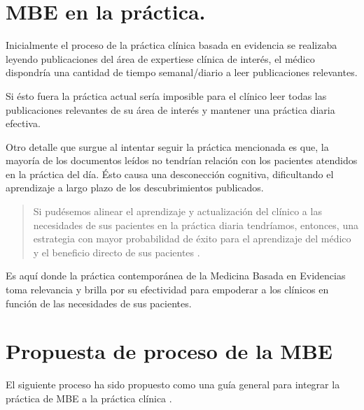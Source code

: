 \documentclass[]{book}
\begin{document}
\hypertarget{mbe-en-la-practica.}{%
\section{MBE en la práctica.}\label{mbe-en-la-practica.}}

Inicialmente el proceso de la práctica clínica basada en evidencia se realizaba leyendo publicaciones del área de expertiese clínica de interés, el médico dispondría una cantidad de tiempo semanal/diario a leer publicaciones relevantes.

Si ésto fuera la práctica actual sería imposible para el clínico leer todas las publicaciones relevantes de su área de interés y mantener una práctica diaria efectiva.

Otro detalle que surgue al intentar seguir la práctica mencionada es que, la mayoría de los documentos leídos no tendrían relación con los pacientes atendidos en la práctica del día. Ésto causa una desconección cognitiva, dificultando el aprendizaje a largo plazo de los descubrimientos publicados.

\begin{quote}
Si pudésemos alinear el aprendizaje y actualización del clínico a las necesidades de sus pacientes en la práctica diaria tendríamos, entonces, una estrategia con mayor probabilidad de éxito para el aprendizaje del médico y el beneficio directo de sus pacientes \citep{bordley1997evidence}.
\end{quote}

Es aquí donde la práctica contemporánea de la Medicina Basada en Evidencias toma relevancia y brilla por su efectividad para empoderar a los clínicos en función de las necesidades de sus pacientes.

\hypertarget{propuesta-de-proceso-de-la-mbe}{%
\section{Propuesta de proceso de la MBE}\label{propuesta-de-proceso-de-la-mbe}}

El siguiente proceso ha sido propuesto como una guía general para integrar la práctica de MBE a la práctica clínica \citep{bordley1997evidence}.
\end{document}

